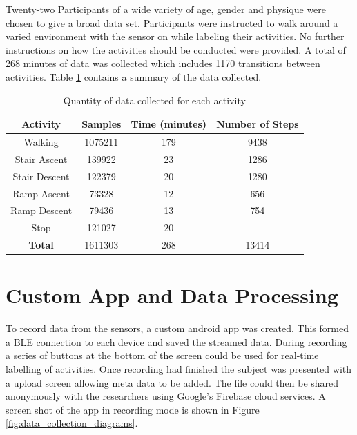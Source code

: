 \documentclass[sensors,article,submit,moreauthors,pdftex]{Definitions/mdpi}
\begin{document}
Twenty-two Participants of a wide variety of age, gender and physique were chosen to give a broad data set. Participants were instructed to walk around a varied environment with the sensor on while labeling their activities. No further instructions on how the activities should be conducted were provided. A total of 268 minutes of data was collected which includes 1170 transitions between activities. Table \ref{tab:data_collected_summary} contains a summary of the data collected.

\begin{table}[!hbt]
    \centering
    \caption{Quantity of data collected for each activity}
    \label{tab:data_collected_summary}
    \begin{tabular}{cccc}
        \textbf{Activity} & \textbf{Samples} & \textbf{Time (minutes)} & \textbf{Number of Steps} \\
         \hline
         Walking & 1075211 & 179 & 9438 \\
         Stair Ascent & 139922 & 23 & 1286 \\
         Stair Descent & 122379 & 20 & 1280 \\ 
         Ramp Ascent & 73328 & 12 & 656 \\
         Ramp Descent & 79436 & 13 & 754 \\
         Stop & 121027 & 20 & - \\
         \hline
         \textbf{Total} & 1611303 & 268 & 13414
    \end{tabular}
\end{table}




\section{Custom App and Data Processing}
\label{sec:app}
To record data from the sensors, a custom android app was created. This formed a BLE connection to each device and saved the streamed data. During recording a series of buttons at the bottom of the screen could be used for real-time labelling of activities. Once recording had finished the subject was presented with a upload screen allowing meta data to be added. The file could then be shared anonymously with the researchers using Google's Firebase cloud services. A screen shot of the app in recording mode is shown in Figure \ref{fig:data_collection_diagrams}.
\end{document}
